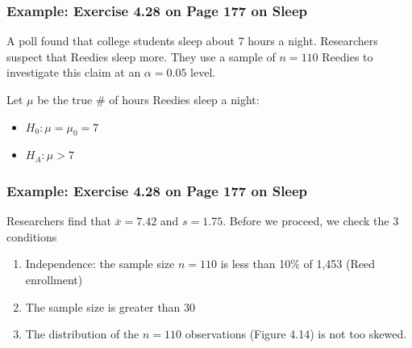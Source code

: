 \documentclass[handout]{beamer}
\newcommand{\xbar}{\overline{x}}
\begin{document}
\begin{frame}
\frametitle{Example:  Exercise 4.28 on Page 177 on Sleep}
A poll found that college students sleep about 7 hours a night.  Researchers suspect that Reedies sleep more.  They use a sample of $n=110$ Reedies to investigate this claim at an $\alpha=0.05$ level.  

\vspace{0.5cm}

\pause Let $\mu$ be the true \# of hours Reedies sleep a night:

\pause \begin{itemize}
\item $H_0: \mu = \mu_0 = 7$
\item $H_A: \mu > 7$
\end{itemize}

\end{frame}



\begin{frame}
\frametitle{Example:  Exercise 4.28 on Page 177 on Sleep}
Researchers find that $\xbar = 7.42$ and $s=1.75$.  Before we proceed, we check the 3 conditions
\begin{enumerate}
\pause \item Independence: the sample size $n=110$ is less than 10\% of 1,453 (Reed enrollment)
\pause \item The sample size is greater than $30$
\pause \item The distribution of the $n=110$ observations (Figure 4.14) is not too skewed.
\end{enumerate}

\end{frame}
\end{document}
